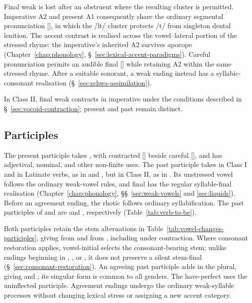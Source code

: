 Final weak  is lost after an obstruent where the resulting cluster is permitted. Imperative A2  and present A1  consequently share the ordinary segmental pronunciation [], in which the /lt/ cluster protects /t/ from singleton dental lenition. The accent contrast is realised across the vowel--lateral portion of the stressed rhyme: the imperative's inherited A2 survives apocope (Chapter~\ref{chap:phonology}, \S~\ref{sec:lexical-accent-paradigms}). Careful pronunciation permits an audible final [] while retaining A2 within the same stressed rhyme. After a suitable sonorant, a weak ending instead has a syllabic-consonant realisation (\S~\ref{sec:schwa-assimilation}).

In Class II, final weak  contracts in imperative  under the conditions described in \S~\ref{sec:vocoid-contraction}; present  and past  remain distinct.

\subsection{Participles}
\label{sec:participial-contraction}

The present participle takes , with contracted [] beside careful [], and has adjectival, nominal, and other non-finite uses. The past participle takes  in Class I and in Latinate verbs, as in  and , but  in Class II, as in . Its unstressed vowel follows the ordinary weak-vowel rules, and final  has the regular syllable-final realisation (Chapter~\ref{chap:phonology}, \S\S~\ref{sec:weak-vowels} and \ref{sec:liquids}). Before an agreement ending, the rhotic follows ordinary syllabification. The past participles of  and  are  and , respectively (Table~\ref{tab:verb-to-be}).

Both participles retain the stem alternations in Table~\ref{tab:vowel-changes-participles}, giving  from  and  from , including under contraction. Where consonant restoration applies, vowel-initial  selects the consonant-bearing stem; unlike endings beginning in , , or , it does not preserve a silent stem-final  (\S~\ref{sec:consonant-restoration}). An agreeing past participle adds  in the plural, giving  and ; its singular form is common to all genders. The have-perfect uses the uninflected participle. Agreement endings undergo the ordinary weak-syllable processes without changing lexical stress or assigning a new accent category.

